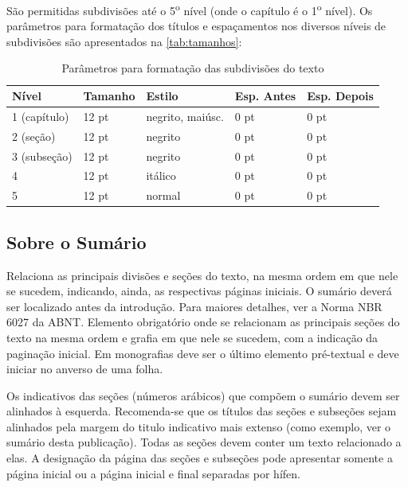 \documentclass[ppgc,diss]{iiufrgs}
\begin{document}
São permitidas subdivisões até o 5\textsuperscript{o} nível (onde o capítulo é o 1\textsuperscript{o} nível). Os parâmetros para formatação dos títulos e espaçamentos nos diversos níveis de subdivisões são apresentados na \autoref{tab:tamanhos}:

\begin{table}[htbp]
	\centering
	\caption{Parâmetros para formatação das subdivisões do texto}
    \label{tab:tamanhos}
	\begin{tabular}{lllll} \toprule
		Nível        & Tamanho & Estilo           & Esp. Antes & Esp. Depois \\ \midrule
		1 (capítulo) & 12 pt   & negrito, maiúsc. & 0 pt       & 0 pt \\
		2 (seção)    & 12 pt   & negrito          & 0 pt       & 0 pt \\
		3 (subseção) & 12 pt   & negrito          & 0 pt       & 0 pt \\
		4            & 12 pt   & itálico          & 0 pt       & 0 pt \\
		5            & 12 pt   & normal           & 0 pt       & 0 pt \\ \bottomrule
	\end{tabular}
\end{table}

\subsection{Sobre o Sumário}
Relaciona as principais divisões e seções do texto, na mesma ordem em que nele se
sucedem, indicando, ainda, as respectivas páginas iniciais. O sumário deverá ser localizado
antes da introdução. Para maiores detalhes, ver a Norma NBR 6027 da ABNT. Elemento
obrigatório onde se relacionam as principais seções do texto na mesma ordem e grafia em que
nele se sucedem, com a indicação da paginação inicial. Em monografias deve ser o último
elemento pré-textual e deve iniciar no anverso de uma folha.

Os indicativos das seções (números arábicos) que compõem o sumário devem ser
alinhados à esquerda. Recomenda-se que os títulos das seções e subseções sejam alinhados
pela margem do titulo indicativo mais extenso (como exemplo, ver o sumário desta
publicação). Todas as seções devem conter um texto relacionado a elas. A designação da
página das seções e subseções pode apresentar somente a página inicial ou a página inicial e final separadas por hífen.
\end{document}
